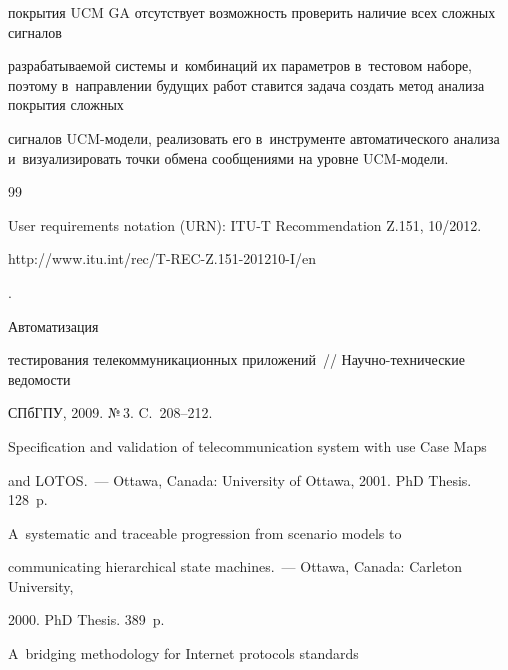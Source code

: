 покрытия UCM GA отсутствует возможность проверить наличие всех сложных сигналов

разрабатываемой системы и~комбинаций их параметров в~тестовом наборе, поэтому в~направлении будущих работ ставится задача создать метод анализа покрытия сложных

сигналов UCM-мо\-де\-ли, реализовать его в~инструменте автоматического анализа и~визуализировать точки обмена сообщениями на уровне UCM-мо\-дели.



\vspace*{-4pt}



{\small\frenchspacing

{%


\begin{thebibliography}{99}



\vspace*{-2pt}


  User requirements notation (URN): ITU-T Recommendation Z.151, 10/2012. {\sf

http://www.itu.int/rec/T-REC-Z.151-201210-I/en}.


 Автоматизация

тестирования телекоммуникационных приложений~/\!\!/ На\-уч\-но-тех\-ни\-че\-ские ведомости

СПбГПУ, 2009. №\,3. C.~208--212.


   Specification and validation of telecommunication system with use Case Maps

and LOTOS.~--- Ottawa, Canada: University of Ottawa, 2001. PhD Thesis. 128~p.


 A~systematic and traceable progression from scenario models to

communicating hierarchical state machines.~--- Ottawa, Canada: Carleton University,

2000. PhD Thesis. 389~p.


   A~bridging methodology for Internet protocols standards


\end{thebibliography}}}

